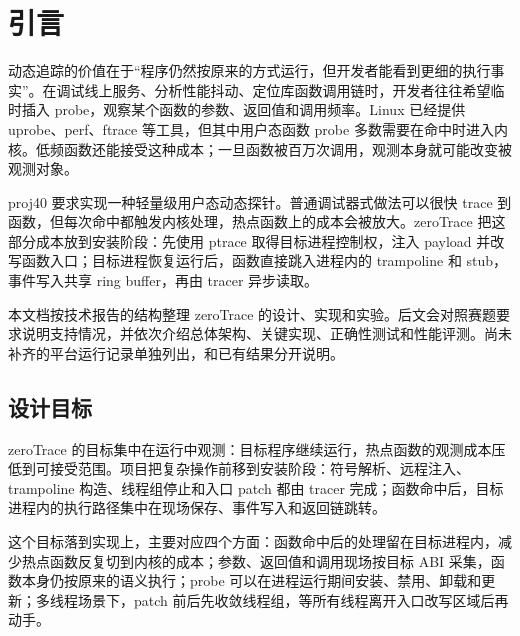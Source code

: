 \documentclass[UTF8,a4paper,11pt,fontset=fandol]{ctexart}
\begin{document}
\section{引言}

动态追踪的价值在于“程序仍然按原来的方式运行，但开发者能看到更细的执行事实”。在调试线上服务、分析性能抖动、定位库函数调用链时，开发者往往希望临时插入 probe，观察某个函数的参数、返回值和调用频率。Linux 已经提供 uprobe、perf、ftrace 等工具，但其中用户态函数 probe 多数需要在命中时进入内核。低频函数还能接受这种成本；一旦函数被百万次调用，观测本身就可能改变被观测对象。

proj40 要求实现一种轻量级用户态动态探针。普通调试器式做法可以很快 trace 到函数，但每次命中都触发内核处理，热点函数上的成本会被放大。zeroTrace 把这部分成本放到安装阶段：先使用 ptrace 取得目标进程控制权，注入 payload 并改写函数入口；目标进程恢复运行后，函数直接跳入进程内的 trampoline 和 stub，事件写入共享 ring buffer，再由 tracer 异步读取。

本文档按技术报告的结构整理 zeroTrace 的设计、实现和实验。后文会对照赛题要求说明支持情况，并依次介绍总体架构、关键实现、正确性测试和性能评测。尚未补齐的平台运行记录单独列出，和已有结果分开说明。

\subsection{设计目标}

zeroTrace 的目标集中在运行中观测：目标程序继续运行，热点函数的观测成本压低到可接受范围。项目把复杂操作前移到安装阶段：符号解析、远程注入、trampoline 构造、线程组停止和入口 patch 都由 tracer 完成；函数命中后，目标进程内的执行路径集中在现场保存、事件写入和返回链跳转。

这个目标落到实现上，主要对应四个方面：函数命中后的处理留在目标进程内，减少热点函数反复切到内核的成本；参数、返回值和调用现场按目标 ABI 采集，函数本身仍按原来的语义执行；probe 可以在进程运行期间安装、禁用、卸载和更新；多线程场景下，patch 前后先收敛线程组，等所有线程离开入口改写区域后再动手。
\end{document}

